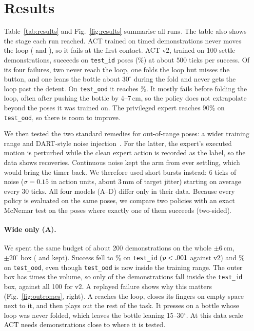 \documentclass[10pt,twocolumn,letterpaper]{article}
\newcommand{\ttt}[1]{\texttt{\small #1}}
\begin{document}
\section{Results}\label{sec:results}
Table~\ref{tab:results} and Fig.~\ref{fig:results} summarise all runs. The table also shows the stage each
run reached. ACT trained on timed demonstrations never moves the loop (\TimedIdMovedK{} and \TimedOodMovedK{}),
so it fails at the first contact. ACT v2, trained on 100 settle
demonstrations, succeeds on \VtwoIdK{} \ttt{test\_id} poses (\VtwoId\%) at about 500 ticks per success. Of its
four failures, two never reach the loop, one folds the loop but misses the button, and one leans the bottle
about $30^\circ$ during the fold and never gets the loop past the detent. On \ttt{test\_ood} it reaches \VtwoOod\%. It mostly fails before folding the loop, often after
pushing the bottle by 4--7\,cm, so the policy does not extrapolate beyond the poses it was trained on. The
privileged expert reaches 90\% on \ttt{test\_ood}, so there is room to improve.

We then tested the two standard remedies for out-of-range poses: a wider training range and DART-style noise
injection~\cite{dart}. For the latter, the expert's executed motion is perturbed while the clean expert action
is recorded as the label, so the data shows recoveries. Continuous noise kept the arm from ever settling, which
would bring the timer back. We therefore used short bursts instead: 6 ticks of noise ($\sigma=0.15$ in action
units, about 3\,mm of target jitter) starting on average every 30 ticks. All four models (A--D) differ only in
their data. Because every policy is evaluated on the same poses, we compare two policies with an exact
McNemar test on the poses where exactly one of them succeeds (two-sided).

\paragraph{Wide only (A).} We spent the same budget of about 200 demonstrations on the whole $\pm6$\,cm,
$\pm20^\circ$ box (\CollWideA{} and \CollWideB{} kept). Success fell to \AId\% on \ttt{test\_id}
($p < .001$ against v2) and \AOod\% on \ttt{test\_ood}, even though
\ttt{test\_ood} is now inside the training range. The outer box has \WideVolume{} times the volume, so only
\AInBox{} of the \ADemos{} demonstrations fall inside the \ttt{test\_id} box, against all 100 for v2. A
replayed failure shows why this matters (Fig.~\ref{fig:outcomes}, right). A reaches the loop, closes its
fingers on empty space next to it, and then plays out the rest of the task. It presses on a bottle whose loop
was never folded, which leaves the bottle leaning 15--30$^\circ$. At this data scale ACT needs demonstrations
close to where it is tested.
\end{document}

